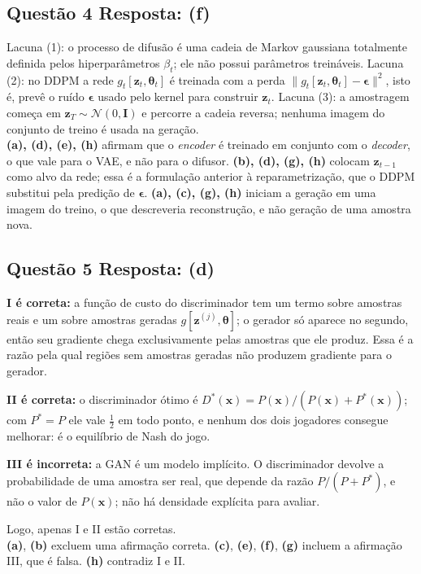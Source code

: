 \documentclass[11pt,a4paper]{article}
\newcommand{\thetav}{\boldsymbol{\theta}}
\begin{document}
\subsection*{Questão 4 \textemdash{} Resposta: (f)}
Lacuna (1): o processo de difusão é uma cadeia de Markov gaussiana totalmente definida pelos hiperparâmetros $\beta_t$; ele não possui parâmetros treináveis. Lacuna (2): no DDPM a rede $g_t[\mathbf{z}_t, \thetav_t]$ é treinada com a perda $\lVert g_t[\mathbf{z}_t,\thetav_t] - \boldsymbol{\epsilon}\rVert^{2}$, isto é, prevê o ruído $\boldsymbol{\epsilon}$ usado pelo kernel para construir $\mathbf{z}_t$. Lacuna (3): a amostragem começa em $\mathbf{z}_T \sim \mathcal{N}(0, \mathbf{I})$ e percorre a cadeia reversa; nenhuma imagem do conjunto de treino é usada na geração.\\
\textbf{(a), (d), (e), (h)} afirmam que o \textit{encoder} é treinado em conjunto com o \textit{decoder}, o que vale para o VAE, e não para o difusor.
\textbf{(b), (d), (g), (h)} colocam $\mathbf{z}_{t-1}$ como alvo da rede; essa é a formulação anterior à reparametrização, que o DDPM substitui pela predição de $\boldsymbol{\epsilon}$.
\textbf{(a), (c), (g), (h)} iniciam a geração em uma imagem do treino, o que descreveria reconstrução, e não geração de uma amostra nova.

\subsection*{Questão 5 \textemdash{} Resposta: (d)}
\textbf{I é correta:} a função de custo do discriminador tem um termo sobre amostras reais e um sobre amostras geradas $g[\mathbf{z}^{(j)}, \thetav]$; o gerador só aparece no segundo, então seu gradiente chega exclusivamente pelas amostras que ele produz. Essa é a razão pela qual regiões sem amostras geradas não produzem gradiente para o gerador.

\textbf{II é correta:} o discriminador ótimo é $D^{*}(\mathbf{x}) = P(\mathbf{x}) / (P(\mathbf{x}) + P^{*}(\mathbf{x}))$; com $P^{*} = P$ ele vale $\tfrac{1}{2}$ em todo ponto, e nenhum dos dois jogadores consegue melhorar: é o equilíbrio de Nash do jogo.

\textbf{III é incorreta:} a GAN é um modelo implícito. O discriminador devolve a probabilidade de uma amostra ser real, que depende da razão $P / (P + P^{*})$, e não o valor de $P(\mathbf{x})$; não há densidade explícita para avaliar.

Logo, apenas I e II estão corretas.\\
\textbf{(a)}, \textbf{(b)} excluem uma afirmação correta.
\textbf{(c)}, \textbf{(e)}, \textbf{(f)}, \textbf{(g)} incluem a afirmação III, que é falsa.
\textbf{(h)} contradiz I e II.
\end{document}
